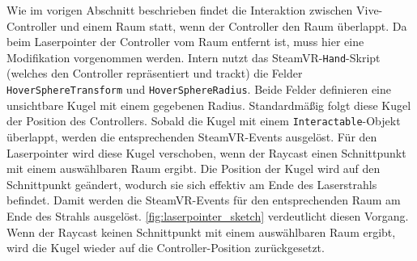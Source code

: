 Wie im vorigen Abschnitt beschrieben findet die Interaktion zwischen Vive-Controller und einem Raum statt, wenn der Controller den Raum überlappt.
Da beim Laserpointer der Controller vom Raum entfernt ist, muss hier eine Modifikation vorgenommen werden.
Intern nutzt das SteamVR-\lstinline|Hand|-Skript (welches den Controller repräsentiert und trackt) die Felder \lstinline|HoverSphereTransform| und \lstinline|HoverSphereRadius|.
Beide Felder definieren eine unsichtbare Kugel mit einem gegebenen Radius.
Standardmäßig folgt diese Kugel der Position des Controllers.
Sobald die Kugel mit einem \lstinline|Interactable|-Objekt überlappt, werden die entsprechenden SteamVR-Events ausgelöst.
Für den Laserpointer wird diese Kugel verschoben, wenn der Raycast einen Schnittpunkt mit einem auswählbaren Raum ergibt.
Die Position der Kugel wird auf den Schnittpunkt geändert, wodurch sie sich effektiv am Ende des Laserstrahls befindet.
Damit werden die SteamVR-Events für den entsprechenden Raum am Ende des Strahls ausgelöst.
\autoref{fig:laserpointer_sketch} verdeutlicht diesen Vorgang.
Wenn der Raycast keinen Schnittpunkt mit einem auswählbaren Raum ergibt, wird die Kugel wieder auf die Controller-Position zurückgesetzt.
